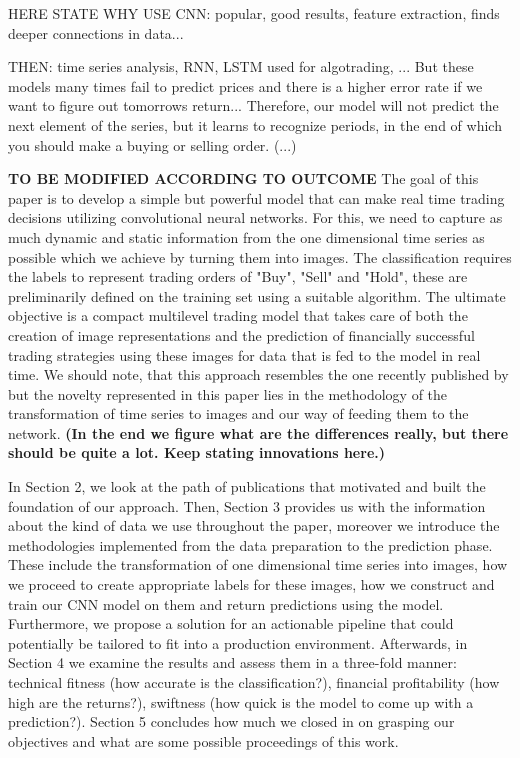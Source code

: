 \documentclass[11pt, a4paper]{article}
\begin{document}
HERE STATE WHY USE CNN: popular, good results, feature extraction, finds deeper connections in data...

THEN: time series analysis, RNN, LSTM used for algotrading, ... But these models many times fail to predict prices and there is a higher error rate if we want to figure out tomorrows return... 
Therefore, our model will not predict the next element of the series, but it learns to recognize periods, in the end of which you should make a buying or selling order. (...)


\textbf{TO BE MODIFIED ACCORDING TO OUTCOME}
The goal of this paper is to develop a simple but powerful model that can make real time trading decisions utilizing convolutional neural networks. For this, we need to capture as much dynamic 
and static information from the one dimensional time series as possible which we achieve by turning them into images. The classification requires the labels to represent trading orders of "Buy", 
"Sell" and "Hold", these are preliminarily defined on the training set using a suitable algorithm. The ultimate objective is a compact multilevel trading model that takes care of both the creation 
of image representations and the prediction of financially successful trading strategies using these images for data that is fed to the model in real time. 
We should note, that this approach resembles the one recently published by \cite{sezer2018algorithmic} but the novelty represented in this paper lies in the methodology of 
the transformation of time series to images and our way of feeding them to the network. \textbf{(In the end we figure what are the differences really, but there should be quite a lot.
Keep stating innovations here.)}

In Section 2, we look at the path of publications that motivated and built the foundation of our approach. Then, Section 3 provides us with the information about the kind of data we use throughout 
the paper, moreover we introduce the methodologies implemented from the data preparation to the prediction phase. These include the transformation of one dimensional time series into images, 
how we proceed to create appropriate labels for these images, how we construct and train our CNN model on them and return predictions using the model. Furthermore, we propose a solution for an 
actionable pipeline that could potentially be tailored to fit into a production environment.
Afterwards, in Section 4 we examine the results and assess them in a three-fold manner:
technical fitness (how accurate is the classification?), financial profitability (how high are the returns?), swiftness (how quick is the model to come up with a prediction?). Section 5 concludes how much 
we closed in on grasping our objectives and what are some possible proceedings of this work.
\end{document}
